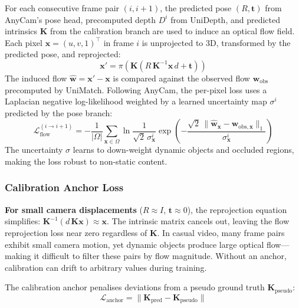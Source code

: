 For each consecutive frame pair $(i, i{+}1)$, the predicted pose $(R, \mathbf{t})$ from AnyCam's pose head, precomputed depth $D^i$ from UniDepth, and predicted intrinsics $\mathbf{K}$ from the calibration branch are used to induce an optical flow field. Each pixel $\mathbf{x} = (u, v, 1)^\top$ in frame $i$ is unprojected to 3D, transformed by the predicted pose, and reprojected:
\begin{equation}
    \mathbf{x}' = \pi\!\left(\mathbf{K}\left(R\,\mathbf{K}^{-1} \mathbf{x}\, d + \mathbf{t}\right)\right)
\end{equation}
The induced flow $\hat{\mathbf{w}} = \mathbf{x}' - \mathbf{x}$ is compared against the observed flow $\mathbf{w}_\text{obs}$ precomputed by UniMatch. Following AnyCam, the per-pixel loss uses a Laplacian negative log-likelihood weighted by a learned uncertainty map $\sigma^i$ predicted by the pose branch:
\begin{equation}
    \mathcal{L}_{\text{flow}}^{(i \to i+1)} = -\frac{1}{|\Omega|} \sum_{\mathbf{x} \in \Omega} \ln \frac{1}{\sqrt{2}\,\sigma^i_\mathbf{x}} \exp\!\left(-\frac{\sqrt{2}\,\|\hat{\mathbf{w}}_\mathbf{x} - \mathbf{w}_{\text{obs},\mathbf{x}}\|_1}{\sigma^i_\mathbf{x}}\right)
\end{equation}
The uncertainty $\sigma$ learns to down-weight dynamic objects and occluded regions, making the loss robust to non-static content.

\subsubsection{Calibration Anchor Loss}

\textbf{For small camera displacements} ($R \approx I$, $\mathbf{t} \approx 0$), the reprojection equation simplifies: $\mathbf{K}^{-1}(d\,\mathbf{K}\mathbf{x}) \approx \mathbf{x}$. The intrinsic matrix cancels out, leaving the flow reprojection loss near zero regardless of $\mathbf{K}$. In casual video, many frame pairs exhibit small camera motion, yet dynamic objects produce large optical flow---making it difficult to filter these pairs by flow magnitude. Without an anchor, calibration can drift to arbitrary values during training.

The calibration anchor penalises deviations from a pseudo ground truth $\mathbf{K}_\text{pseudo}$:
\begin{equation}
    \mathcal{L}_\text{anchor} = \|\mathbf{K}_\text{pred} - \mathbf{K}_\text{pseudo}\|
\end{equation}

